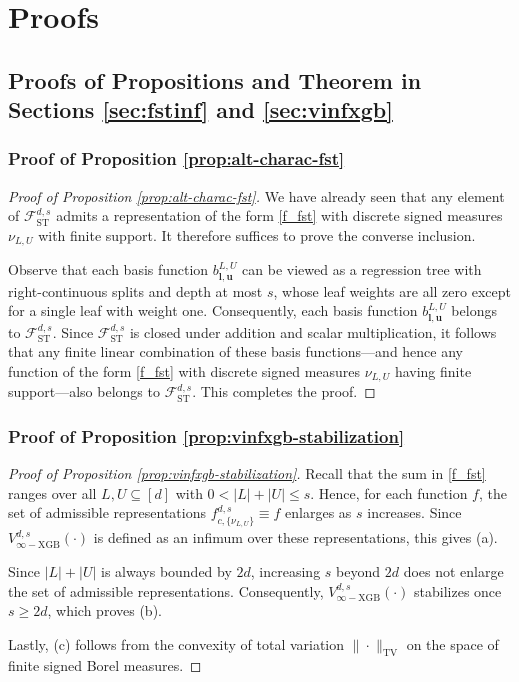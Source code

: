 \documentclass[10pt]{article}
\newcommand{\fst}{{\mathcal{F}^{d, s}_{\text{ST}}}}
\newcommand{\vinfxgb}{{V^{d, s}_{\infty-\text{XGB}}}}
\newcommand{\fcnu}{{f^{d, s}_{c, \{\nu_{L, U}\}}}}
\newcommand{\lbf}{{\mathbf{l}}}
\newcommand{\ubf}{{\mathbf{u}}}
\begin{document}




\newpage
\appendix


\section{Proofs}\label{sec:proofs}

\subsection{Proofs of Propositions and Theorem in 
Sections \ref{sec:fstinf} and \ref{sec:vinfxgb}}

\subsubsection{Proof of Proposition \ref{prop:alt-charac-fst}}
\label{pf:alt-charac-fst}
\begin{proof}[Proof of Proposition \ref{prop:alt-charac-fst}]
We have already seen that any element of $\fst$ admits a 
representation of the form \eqref{f_fst} with discrete signed 
measures $\nu_{L, U}$ with finite support. It 
therefore suffices to prove the converse inclusion.

Observe that each basis function $b^{L, U}_{\lbf, \ubf}$ can be 
viewed as a regression tree with right-continuous splits and depth 
at most $s$, whose leaf weights are all zero except for a single 
leaf with weight one. Consequently, each basis function 
$b^{L, U}_{\lbf, \ubf}$ belongs to $\fst$. Since $\fst$ is closed 
under addition and scalar multiplication, it follows that any finite 
linear combination of these basis functions—and hence any function 
of the form \eqref{f_fst} with discrete signed measures $\nu_{L, U}$ 
having finite support—also belongs to $\fst$. This completes the proof.
\end{proof}



\subsubsection{Proof of Proposition \ref{prop:vinfxgb-stabilization}}
\label{pf:vinfxgb-stabilization}
\begin{proof}[Proof of Proposition \ref{prop:vinfxgb-stabilization}]
Recall that the sum in \eqref{f_fst} ranges over all
$L, U \subseteq [d]$ with $0 < |L| + |U| \le s$. Hence, for each function 
$f$, the set of admissible representations $\fcnu \equiv f$ enlarges 
as $s$ increases. Since $\vinfxgb(\cdot)$ is defined as an infimum over 
these representations, this gives (a).

Since $|L| + |U|$ is always bounded by $2d$, increasing $s$ beyond $2d$ 
does not enlarge the set of admissible representations. Consequently, 
$\vinfxgb(\cdot)$ stabilizes once $s \ge 2d$, which proves (b).

Lastly, (c) follows from the convexity of total variation 
$\|\cdot\|_{\text{TV}}$ on the space of finite signed Borel measures.
\end{proof}
\end{document}

